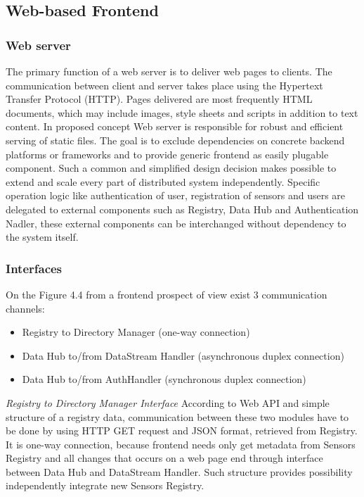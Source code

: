   \subsection{Web-based Frontend}
    \subsubsection{Web server}
      The primary function of a web server is to deliver web pages to clients. The communication between client and server takes place using the Hypertext Transfer Protocol (HTTP). Pages delivered are most frequently HTML documents, which may include images, style sheets and scripts in addition to text content. 
      \newline 
      In proposed concept Web server is responsible for robust and efficient serving of static files. The goal is to exclude dependencies on concrete backend platforms or frameworks and to provide generic frontend as easily plugable component. Such a common and simplified design decision makes possible to extend and scale every part of distributed system independently. Specific operation logic like authentication of user, registration of sensors and users are delegated to external components such as Registry, Data Hub and Authentication Nadler, these external components can be interchanged without dependency to the system itself.

    \subsubsection{Interfaces}
      On the Figure 4.4 from a frontend prospect of view exist 3 communication channels: 
      \begin{itemize}
      \item Registry to Directory Manager (one-way connection)
      \item Data Hub to/from DataStream Handler (asynchronous duplex connection) 
      \item Data Hub to/from AuthHandler (synchronous duplex connection) 
      \end{itemize}

      \emph{Registry to Directory Manager Interface}
      According to Web API and simple structure of a registry data, communication between these two modules have to be done by using HTTP GET request and JSON format, retrieved from Registry. It is one-way connection, because frontend needs only get metadata from Sensors Registry and all changes that occurs on a web page end through interface between Data Hub and DataStream Handler. Such structure provides possibility independently integrate new Sensors Registry.

